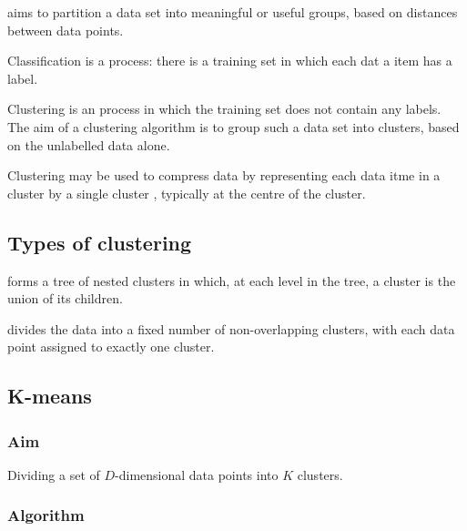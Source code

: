 \documentclass{article}
\begin{document}
\begin{definition}
	 aims to partition a data set into meaningful or useful
	groups, based on distances between data points.
\end{definition}
\begin{definition}
	Classification is a  process: there is a training
	set in which each dat a item has a label.
\end{definition}
\begin{definition}
	Clustering is an  process in which the training
	set does not contain any labels. The aim of a clustering algorithm is to group
	such a data set into clusters, based on the unlabelled data alone.
\end{definition}
\begin{definition}
	Clustering may be used to compress data by representing each data itme
	in a cluster by a single cluster , typically at the centre
	of the cluster.
\end{definition}

\subsection{Types of clustering}

\begin{definition}
	 forms a tree of nested clusters in which, at
	each level in the tree, a cluster is the union of its children.
\end{definition}
\begin{definition}
	 divides the data into a fixed number of
	non-overlapping clusters, with each data point assigned to exactly one
	cluster.
\end{definition}

\subsection{K-means}

\subsubsection{Aim}

Dividing a set of $D$-dimensional data points into $K$ clusters.

\subsubsection{Algorithm}
\end{document}
